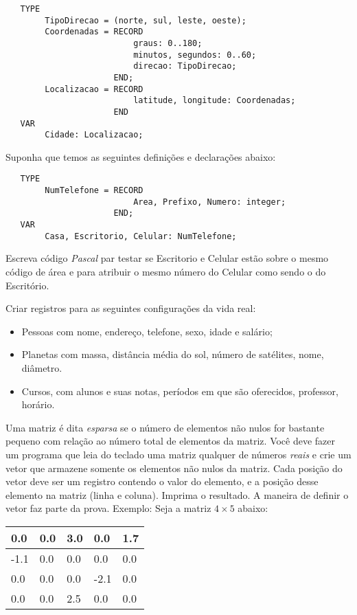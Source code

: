 \begin{verbatim}
   TYPE 
        TipoDirecao = (norte, sul, leste, oeste);
        Coordenadas = RECORD
                          graus: 0..180;
                          minutos, segundos: 0..60;
                          direcao: TipoDirecao;
                      END;
        Localizacao = RECORD
                          latitude, longitude: Coordenadas;
                      END
   VAR
        Cidade: Localizacao;
\end{verbatim}

\item Suponha que temos as seguintes definições e declarações abaixo:

\begin{verbatim}
   TYPE 
        NumTelefone = RECORD
                          Area, Prefixo, Numero: integer;
                      END;
   VAR
        Casa, Escritorio, Celular: NumTelefone;
\end{verbatim}

   Escreva código \emph{Pascal} par testar  se Escritorio e Celular estão sobre
   o mesmo código de área e para atribuir o mesmo número do Celular como
   sendo o do Escritório.

\item Criar registros para as seguintes configurações da vida real:
\begin{itemize}
  \item Pessoas com nome, endereço, telefone, sexo, idade e salário;
   \item Planetas  com massa, distância  média do sol, número  de satélites,
     nome, diâmetro. 
   \item Cursos,  com alunos e suas  notas, períodos em  que são oferecidos,
     professor, horário.
\end{itemize}

\item Uma matriz é dita \textit{esparsa} se o 
número de elementos não nulos for bastante pequeno com relação
ao número total de elementos da matriz. Você deve fazer um programa
que leia do teclado uma matriz qualquer de números \textit{reais} e crie um 
vetor que armazene somente os elementos não nulos da matriz. Cada
posição do vetor deve ser um registro contendo o valor do elemento,
e a posição desse elemento na matriz (linha e coluna).
Imprima o resultado. A maneira de definir o vetor faz parte da prova.
Exemplo:
Seja a matriz $4 \times 5$ abaixo:

\begin{center}
\begin{tabular}{|l|l|l|l|l|}  \hline
0.0  & 0.0 & 3.0 & 0.0  & 1.7 \\ \hline
-1.1 & 0.0 & 0.0 & 0.0  & 0.0 \\ \hline
0.0  & 0.0 & 0.0 & -2.1 & 0.0 \\ \hline
0.0  & 0.0 & 2.5 & 0.0  & 0.0 \\ \hline
\end{tabular}
\end{center}

